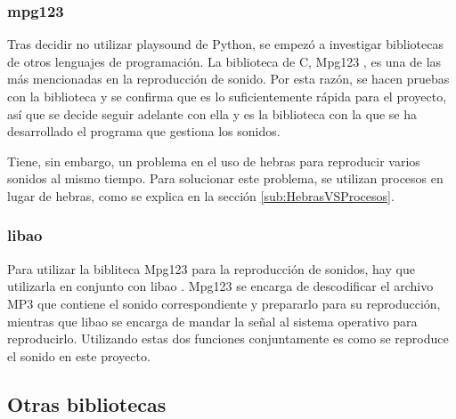 
            \subsubsection{mpg123} %
            \label{ssub:Mpg123}

                Tras decidir no utilizar playsound de Python, se empezó a investigar bibliotecas de otros lenguajes de
                programación. La biblioteca de C, Mpg123 \cite{mpg123}, es una de las más mencionadas en la reproducción
                de sonido. Por esta razón, se hacen pruebas con la biblioteca y se confirma que es lo suficientemente
                rápida para el proyecto, así que se decide seguir adelante con ella y es la biblioteca con la que se ha
                desarrollado el programa que gestiona los sonidos.

                Tiene, sin embargo, un problema en el uso de hebras para reproducir varios sonidos al mismo tiempo. Para
                solucionar este problema, se utilizan procesos en lugar de hebras, como se explica en la sección
                \ref{sub:HebrasVSProcesos}.


            \subsubsection{libao} %
            \label{ssub:Libao}

                Para utilizar la bibliteca Mpg123 para la reproducción de sonidos, hay que utilizarla en conjunto con
                libao \cite{libao}. Mpg123 se encarga de descodificar el archivo MP3 que contiene el sonido
                correspondiente y prepararlo para su reproducción, mientras que libao se encarga de mandar la señal al
                sistema operativo para reproducirlo. Utilizando estas dos funciones conjuntamente es como se reproduce
                el sonido en este proyecto.



        \subsection{Otras bibliotecas} %
        \label{sub:OtrasLibrerias}

